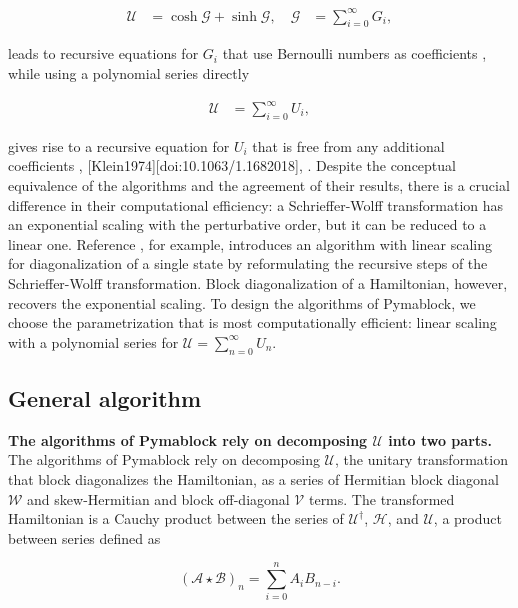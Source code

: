 \begin{align}
\mathcal{U} &= \cosh{\mathcal{G}} + \sinh{\mathcal{G}}, \quad
\mathcal{G} &= \sum_{i=0}^{\infty} G_i,
\end{align}

leads to recursive equations for $G_i$ that use Bernoulli numbers as
coefficients \cite{Shavitt_1980}, while using a polynomial
series directly

\begin{align}
\mathcal{U} &= \sum_{i=0}^{\infty} U_i,
\end{align}

gives rise to a recursive equation for $U_i$ that is free from any additional
coefficients
\cite{Van_Vleck_1929}, \cite{L_wdin_1962}
[Klein1974][doi:10.1063/1.1682018], \cite{Suzuki_1983}.
Despite the conceptual equivalence of the algorithms and the agreement of
their results, there is a crucial difference in their computational efficiency:
a Schrieffer-Wolff transformation has an exponential scaling with the
perturbative order, but it can be reduced to a linear one.
Reference \cite{Li_2022}, for example, introduces an
algorithm with linear scaling for diagonalization of a single state by
reformulating the recursive steps of the Schrieffer-Wolff transformation.
Block diagonalization of a Hamiltonian, however, recovers the exponential
scaling.
To design the algorithms of Pymablock, we choose the parametrization that is
most computationally efficient: linear scaling with a polynomial series for
$\mathcal{U} = \sum_{n=0}^{\infty} U_n$.

\subsection{General algorithm}

\textbf{The algorithms of Pymablock rely on decomposing $\mathcal{U}$ into two parts.}
The algorithms of Pymablock rely on decomposing $\mathcal{U}$, the unitary transformation
that block diagonalizes the Hamiltonian, as a series of Hermitian
block diagonal $\mathcal{W}$ and skew-Hermitian and block off-diagonal $\mathcal{V}$ terms.
The transformed Hamiltonian is a Cauchy product between the series of
$\mathcal{U}^{\dagger}$, $\mathcal{H}$, and $\mathcal{U}$, a product between
series defined as

\begin{equation}
\label{cauchy_product}
(\mathcal{A} \star \mathcal{B})_{n} = \sum_{i=0}^{n} A_{i} B_{n-i}.
\end{equation}

